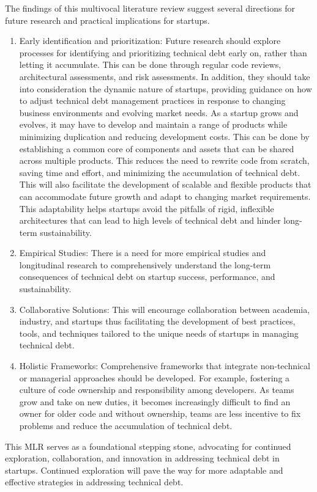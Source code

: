 \documentclass[manuscript]{acmart}
\begin{document}
The findings of this multivocal literature review suggest several directions for future research and practical implications for startups.
\begin{enumerate}
    \item Early identification and prioritization: Future research should explore processes for identifying and prioritizing technical debt early on, rather than letting it accumulate. This can be done through regular code reviews, architectural assessments, and risk assessments. In addition, they should take into consideration the dynamic nature of startups, providing guidance on how to adjust technical debt management practices in response to changing business environments and evolving market needs. As a startup grows and evolves, it may have to develop and maintain a range of products while minimizing duplication and reducing development costs. This can be done by establishing a common core of components and assets that can be shared across multiple products. This reduces the need to rewrite code from scratch, saving time and effort, and minimizing the accumulation of technical debt. This will also facilitate the development of scalable and flexible products that can accommodate future growth and adapt to changing market requirements. This adaptability helps startups avoid the pitfalls of rigid, inflexible architectures that can lead to high levels of technical debt and hinder long-term sustainability.
    \item Empirical Studies: There is a need for more empirical studies and longitudinal research to comprehensively understand the long-term consequences of technical debt on startup success, performance, and sustainability.
    \item Collaborative Solutions: This will encourage collaboration between academia, industry, and startups thus facilitating the development of best practices, tools, and techniques tailored to the unique needs of startups in managing technical debt.
    \item Holistic Frameworks: Comprehensive frameworks that integrate non-technical or managerial approaches should be developed. For example, fostering a culture of code ownership and responsibility among developers. As teams grow and take on new duties, it becomes increasingly difficult to find an owner for older code and without ownership, teams are less incentive to fix problems and reduce the accumulation of technical debt.
\end{enumerate}

This MLR serves as a foundational stepping stone, advocating for continued exploration, collaboration, and innovation in addressing technical debt in startups.
Continued exploration will pave the way for more adaptable and effective strategies in addressing technical debt.


\balance
%



% 
\end{document}
